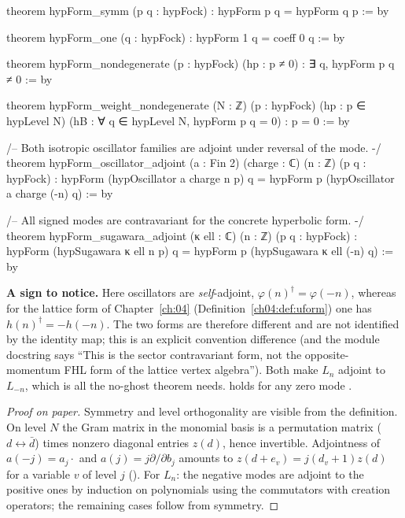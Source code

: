 \begin{leancode}
theorem hypForm_symm (p q : hypFock) : hypForm p q = hypForm q p := by

theorem hypForm_one (q : hypFock) : hypForm 1 q = coeff 0 q := by

theorem hypForm_nondegenerate (p : hypFock) (hp : p ≠ 0) : ∃ q, hypForm p q ≠ 0 := by

theorem hypForm_weight_nondegenerate (N : ℤ) (p : hypFock) (hp : p ∈ hypLevel N)
    (hB : ∀ q ∈ hypLevel N, hypForm p q = 0) : p = 0 := by

/-- Both isotropic oscillator families are adjoint under reversal of the mode. -/
theorem hypForm_oscillator_adjoint (a : Fin 2) (charge : ℂ) (n : ℤ) (p q : hypFock) :
    hypForm (hypOscillator a charge n p) q =
      hypForm p (hypOscillator a charge (-n) q) := by

/-- All signed modes are contravariant for the concrete hyperbolic form. -/
theorem hypForm_sugawara_adjoint (κ ell : ℂ) (n : ℤ) (p q : hypFock) :
    hypForm (hypSugawara κ ell n p) q = hypForm p (hypSugawara κ ell (-n) q) := by
\end{leancode}

\begin{dictionary}
\textbf{A sign to notice.} Here oscillators are \emph{self}-adjoint, $\varphi(n)^\dagger=\varphi(-n)$, whereas for the lattice form
of Chapter~\ref{ch:04} (Definition~\ref{ch04:def:uform}) one has $h(n)^\dagger=-h(-n)$.  The two forms are therefore
different and are not identified by the identity map; this is an
explicit convention difference (and the module docstring says ``This is the sector contravariant form, not the
opposite-momentum FHL form of the lattice vertex algebra'').  Both make $L_n$ adjoint to $L_{-n}$, which is all
the no-ghost theorem needs.   holds for any zero mode .
\end{dictionary}

\begin{proof}[Proof on paper]
Symmetry and level orthogonality are visible from the definition.  On level $N$ the Gram matrix in the
monomial basis is a permutation matrix ($d\leftrightarrow\bar d$) times nonzero diagonal entries $z(d)$, hence
invertible.  Adjointness of $a(-j)=a_j\cdot$ and $a(j)=j\partial/\partial b_j$ amounts to $z(d+e_v)=j(d_v+1)z(d)$ for a
variable $v$ of level $j$ ().  For $L_n$: the negative modes are adjoint to the
positive ones by induction on polynomials using the commutators with creation operators; the remaining cases
follow from symmetry.
\end{proof}

